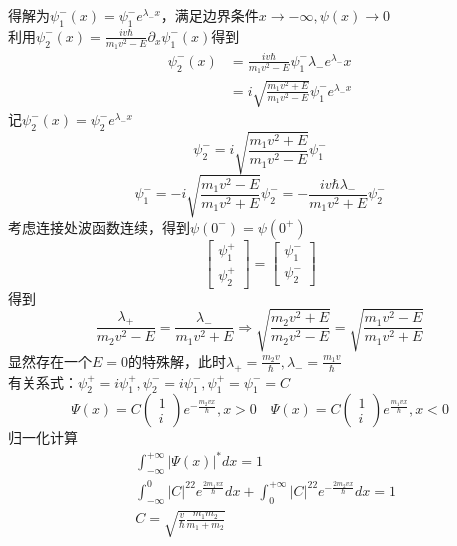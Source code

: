 \documentclass{article}
\numberwithin{equation}{subsection}
\begin{document}
得解为$\psi_1^-(x)=\psi_1^-e^{\lambda_-x}$，满足边界条件$x\to-\infty,\psi(x)\to0$\\
利用$\psi_2^-(x)=\frac{iv\hbar}{m_1v^2-E}\partial_x\psi_1^-(x)$得到
\begin{equation}
    \begin{split}
        \psi_2^-(x)&=\frac{iv\hbar}{m_1v^2-E}\psi_1^-\lambda_-e^{\lambda_-}x\\
        &=i\sqrt{\frac{m_1v^2+E}{m_1v^2-E}}\psi_1^-e^{\lambda_-x}
    \end{split}
\end{equation}
记$\psi_2^-(x)=\psi_2^-e^{\lambda_-x}$
\begin{equation}
    \psi_2^-=i\sqrt{\frac{m_1v^2+E}{m_1v^2-E}}\psi_1^-
\end{equation}
\begin{equation}
    \psi_1^-=-i\sqrt{\frac{m_1v^2-E}{m_1v^2+E}}\psi_2^-=-\frac{iv\hbar\lambda_-}{m_1v^2+E}\psi_2^-
\end{equation}
考虑连接处波函数连续，得到$\psi(0^-)=\psi(0^+)$
\begin{equation}
    \begin{bmatrix}
        \psi_1^+\\
        \psi_2^+
    \end{bmatrix}=\begin{bmatrix}
        \psi_1^-\\
        \psi_2^-
    \end{bmatrix}
\end{equation}
得到
\begin{equation}
    \frac{\lambda_+}{m_2v^2-E}=\frac{\lambda_-}{m_1v^2+E}\Rightarrow\sqrt{\frac{m_2v^2+E}{m_2v^2-E}}=\sqrt{\frac{m_1v^2-E}{m_1v^2+E}}
\end{equation}
显然存在一个$E=0$的特殊解，此时$\lambda_+=\frac{m_2v}{\hbar},\lambda_-=\frac{m_1v}{\hbar}$\\
有关系式：$\psi_2^+=i\psi_1^+,\psi_2^-=i\psi_1^-,\psi_1^+=\psi_1^-=C$
\begin{equation}
    \Psi(x)=C\begin{pmatrix}
        1\\
        i
    \end{pmatrix}e^{-\frac{m_2vx}{\hbar}},x>0\quad\Psi(x)=C\begin{pmatrix}
        1\\i
    \end{pmatrix}e^{\frac{m_1vx}{\hbar}},x<0
\end{equation}
归一化计算
\begin{equation}
    \begin{split}
        &\int_{-\infty}^{+\infty}|\Psi(x)|^*dx=1\\
        &\int_{-\infty}^{0}|C|^22e^{\frac{2m_1vx}{\hbar}}dx+\int_{0}^{+\infty}|C|^22e^{-\frac{2m_2vx}{\hbar}}dx=1\\
        &C=\sqrt{\frac{v}{\hbar}\frac{m_1m_2}{m_1+m_2}}
    \end{split}
\end{equation}
\end{document}
